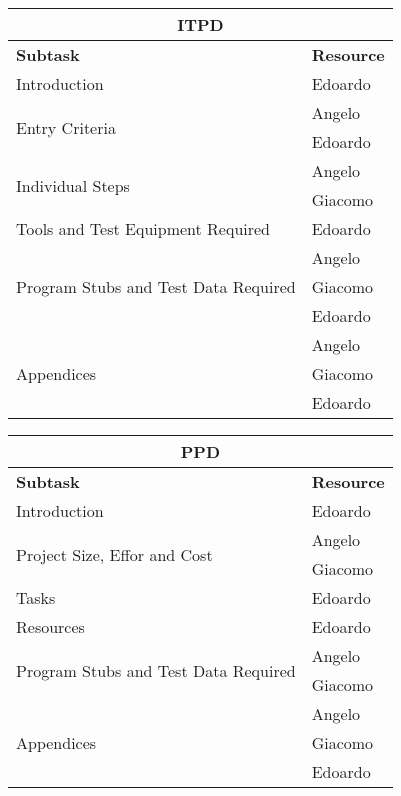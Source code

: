 \begin{center}
\begin{tabular}{ |l|l| }
	\multicolumn{2}{c}{\textbf{ITPD}} \\ \hline
	\textbf{Subtask} & \textbf{Resource} \\ \hline
	\multirow{1}{*}{Introduction} & Edoardo \\ \hline
	\multirow{2}{*}{Entry Criteria} & Angelo \\ 
									& Edoardo \\ \hline
	\multirow{2}{*}{Individual Steps} & Angelo \\
										& Giacomo \\ \hline
	\multirow{1}{*}{Tools and Test Equipment Required} & Edoardo \\ \hline
	\multirow{3}{*}{Program Stubs and Test Data Required} & Angelo \\ 
				& Giacomo \\
				& Edoardo \\ \hline
	\multirow{3}{*}{Appendices} & Angelo \\ 
				& Giacomo \\
				& Edoardo \\ \hline

\end{tabular}
\end{center}

\vspace* {30px}

\begin{center}
\begin{tabular}{ |l|l| }
	\multicolumn{2}{c}{\textbf{PPD}} \\ \hline
	\textbf{Subtask} & \textbf{Resource} \\ \hline
	\multirow{1}{*}{Introduction} & Edoardo \\ \hline
	\multirow{2}{*}{Project Size, Effor and Cost} & Angelo \\ 
									& Giacomo \\ \hline
	\multirow{1}{*}{Tasks} & Edoardo \\ \hline
	\multirow{1}{*}{Resources} & Edoardo \\ \hline
	\multirow{2}{*}{Program Stubs and Test Data Required} & Angelo \\ 
				& Giacomo \\ \hline
	\multirow{3}{*}{Appendices} & Angelo \\ 
				& Giacomo \\
				& Edoardo \\ \hline

\end{tabular}
\end{center}

